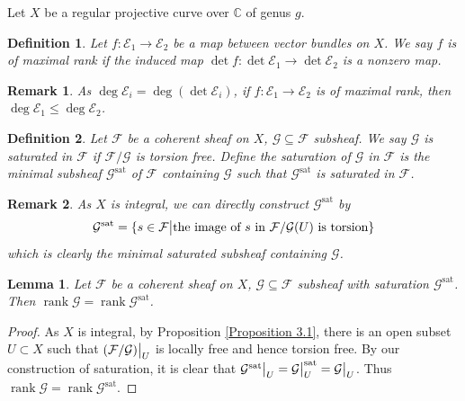 \documentclass{ctexart}
\newtheorem{definition}{Definition}[section]
\newtheorem{remark}{Remark}[section]
\newtheorem{lemma}{Lemma}[section]
\newcommand{\rank}{\operatorname{rank}}
\newcommand{\saturation}{\operatorname{sat}}
\begin{document}
Let $X$ be a regular projective curve over $\mathbb{C}$ of genus $g$.
\begin{definition}
    Let $f: \mathcal{E}_{1} \rightarrow \mathcal{E}_{2}$ be a map between vector bundles on $X$.
    We say $f$ is of maximal rank if the induced map $\det f: \det \mathcal{E}_{1} \rightarrow \det \mathcal{E}_{2}$ is a nonzero map.
\end{definition}
\begin{remark}
    As $\deg \mathcal{E}_{i} = \deg (\det \mathcal{E}_{i})$,
    if $f: \mathcal{E}_{1} \rightarrow \mathcal{E}_{2}$ is of maximal rank, then $\deg \mathcal{E}_{1} \le \deg \mathcal{E}_{2}$.
\end{remark}
\begin{definition}
    Let $\mathcal{F}$ be a coherent sheaf on $X$, $\mathcal{G} \subseteq \mathcal{F}$ subsheaf.
    We say $\mathcal{G}$ is saturated in $\mathcal{F}$ if $\mathcal{F}/\mathcal{G}$ is torsion free.
    Define the saturation of $\mathcal{G}$ in $\mathcal{F}$ is the minimal subsheaf $\mathcal{G}^{\saturation}$ of $\mathcal{F}$ containing $\mathcal{G}$ such that $\mathcal{G}^{\saturation}$ is saturated in $\mathcal{F}$.
\end{definition}
\begin{remark}
    As $X$ is integral, we can directly construct $\mathcal{G}^{\saturation}$ by
    \begin{equation}
        \mathcal{G}^{\saturation} = \{s\in \mathcal{F} \big{|} \text{the image of $s$ in $\mathcal{F}/\mathcal{G}(U)$ is torsion}\}
    \end{equation}
    which is clearly the minimal saturated subsheaf containing $\mathcal{G}$. 
\end{remark}
\begin{lemma}
    Let $\mathcal{F}$ be a coherent sheaf on $X$, $\mathcal{G} \subseteq \mathcal{F}$ subsheaf with saturation $\mathcal{G}^{\saturation}$.
    Then $\rank \mathcal{G} = \rank \mathcal{G}^{\saturation}$.
    \label{Lemma 6.1}
\end{lemma}
\begin{proof}
    As $X$ is integral, by Proposition \ref{Proposition 3.1}, there is an open subset $U \subset X$ such that $(\mathcal{F}/\mathcal{G})\big{|}_{U}$ is locally free and hence torsion free.
    By our construction of saturation, it is clear that $\mathcal{G}^{\saturation}\big{|}_{U} = \mathcal{G}\big{|}_{U}^{\saturation} = \mathcal{G}\big{|}_{U}$.
    Thus $\rank \mathcal{G} = \rank \mathcal{G}^{\saturation}$.
\end{proof}
\end{document}
